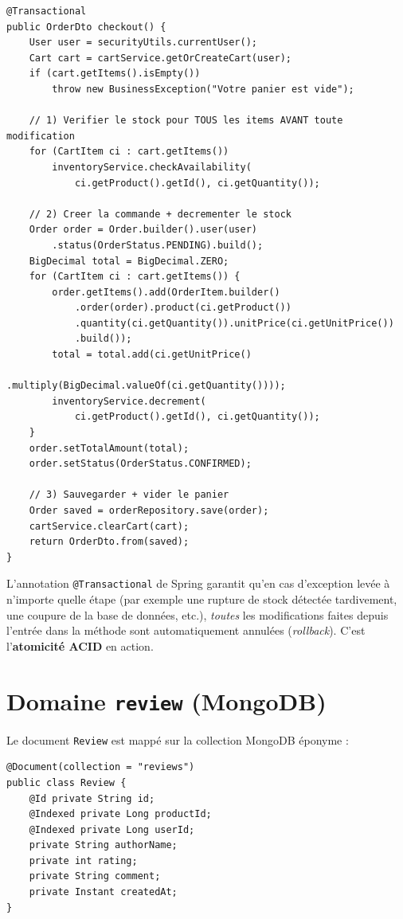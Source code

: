 \documentclass[11pt,a4paper,oneside]{report}
\begin{document}
\begin{lstlisting}[style=javastyle, caption=OrderService.checkout() — l'operation transactionnelle]
@Transactional
public OrderDto checkout() {
    User user = securityUtils.currentUser();
    Cart cart = cartService.getOrCreateCart(user);
    if (cart.getItems().isEmpty())
        throw new BusinessException("Votre panier est vide");

    // 1) Verifier le stock pour TOUS les items AVANT toute modification
    for (CartItem ci : cart.getItems())
        inventoryService.checkAvailability(
            ci.getProduct().getId(), ci.getQuantity());

    // 2) Creer la commande + decrementer le stock
    Order order = Order.builder().user(user)
        .status(OrderStatus.PENDING).build();
    BigDecimal total = BigDecimal.ZERO;
    for (CartItem ci : cart.getItems()) {
        order.getItems().add(OrderItem.builder()
            .order(order).product(ci.getProduct())
            .quantity(ci.getQuantity()).unitPrice(ci.getUnitPrice())
            .build());
        total = total.add(ci.getUnitPrice()
                            .multiply(BigDecimal.valueOf(ci.getQuantity())));
        inventoryService.decrement(
            ci.getProduct().getId(), ci.getQuantity());
    }
    order.setTotalAmount(total);
    order.setStatus(OrderStatus.CONFIRMED);

    // 3) Sauvegarder + vider le panier
    Order saved = orderRepository.save(order);
    cartService.clearCart(cart);
    return OrderDto.from(saved);
}
\end{lstlisting}

\begin{infobox}
L'annotation \texttt{@Transactional} de Spring garantit qu'en cas
d'exception levée à n'importe quelle étape (par exemple une rupture de
stock détectée tardivement, une coupure de la base de données, etc.), \emph{toutes} les modifications faites depuis l'entrée dans la méthode
sont automatiquement annulées (\textit{rollback}). C'est l'\textbf{atomicité
ACID} en action.
\end{infobox}

\section{Domaine \texttt{review} (MongoDB)}

Le document \texttt{Review} est mappé sur la collection MongoDB éponyme :

\begin{lstlisting}[style=javastyle, caption=Document MongoDB Review]
@Document(collection = "reviews")
public class Review {
    @Id private String id;
    @Indexed private Long productId;
    @Indexed private Long userId;
    private String authorName;
    private int rating;
    private String comment;
    private Instant createdAt;
}
\end{lstlisting}
\end{document}
